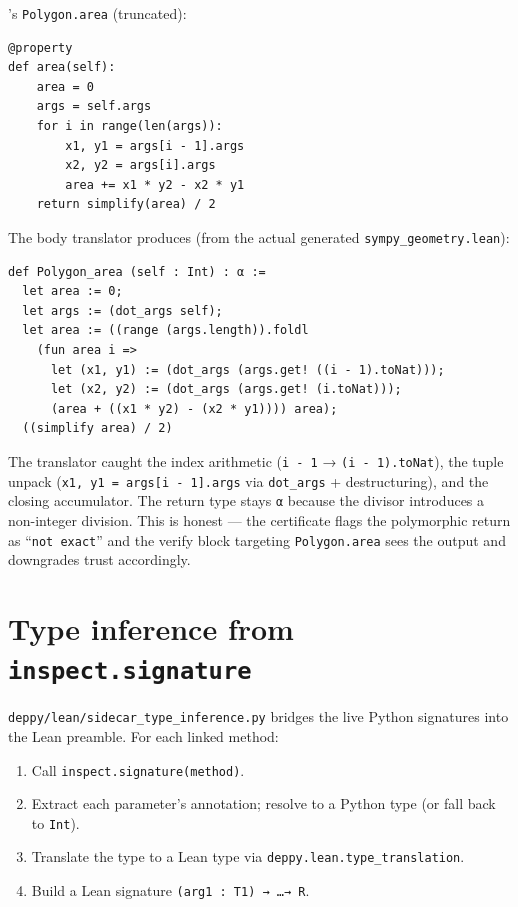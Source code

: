 \Sympy's \texttt{Polygon.area} (truncated):

\begin{lstlisting}[language=psdl]
@property
def area(self):
    area = 0
    args = self.args
    for i in range(len(args)):
        x1, y1 = args[i - 1].args
        x2, y2 = args[i].args
        area += x1 * y2 - x2 * y1
    return simplify(area) / 2
\end{lstlisting}

The body translator produces (from the actual generated
\texttt{sympy\_geometry.lean}):

\begin{lstlisting}[language=lean4]
def Polygon_area (self : Int) : α :=
  let area := 0;
  let args := (dot_args self);
  let area := ((range (args.length)).foldl
    (fun area i =>
      let (x1, y1) := (dot_args (args.get! ((i - 1).toNat)));
      let (x2, y2) := (dot_args (args.get! (i.toNat)));
      (area + ((x1 * y2) - (x2 * y1)))) area);
  ((simplify area) / 2)
\end{lstlisting}

The translator caught the index arithmetic
(\texttt{i - 1} → \texttt{(i - 1).toNat}), the tuple unpack
(\texttt{x1, y1 = args[i - 1].args} via \texttt{dot\_args} +
destructuring), and the closing accumulator.  The return type stays
\texttt{α} because the divisor introduces a non-integer division.
This is honest --- the certificate flags the polymorphic return as
``\texttt{not exact}'' and the verify block targeting
\texttt{Polygon.area} sees the output and downgrades trust
accordingly.

\section{Type inference from \texttt{inspect.signature}}
\label{sec:type-inference}

\texttt{deppy/lean/sidecar\_type\_inference.py} bridges the live
Python signatures into the Lean preamble.  For each linked method:
\begin{enumerate}[leftmargin=1.7em]
  \item Call \texttt{inspect.signature(method)}.
  \item Extract each parameter's annotation; resolve to a Python
    type (or fall back to \texttt{Int}).
  \item Translate the type to a Lean type via
    \texttt{deppy.lean.type\_translation}.
  \item Build a Lean signature \texttt{(arg1 : T1) → \dots → R}.
\end{enumerate}


